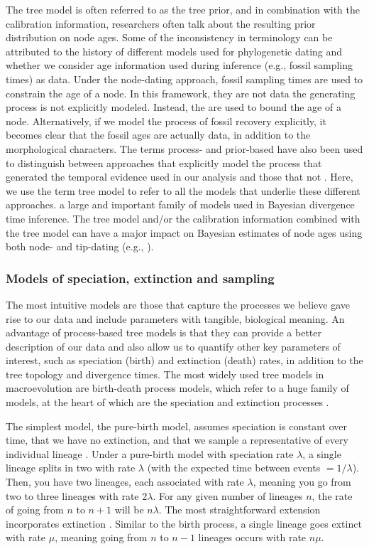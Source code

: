 The tree model is often referred to as the tree prior, and in combination with the calibration information, researchers often talk about the resulting prior distribution on node ages.
Some of the inconsistency in terminology can be attributed to the history of different models used for phylogenetic dating and whether we consider age information used during inference (e.g., fossil sampling times) as data.
Under the node-dating approach, fossil sampling times are used to constrain the age of a node.
In this framework, they are not data  the generating process is not explicitly modeled.
Instead, the  are used to bound the age of a node.
Alternatively, if we model the process of fossil recovery explicitly, it becomes clear that the fossil ages are actually data, in addition to the morphological characters.
The terms process- and prior-based have also been used to distinguish between approaches that explicitly model the  process that generated the temporal evidence used in our analysis and those that  not \citep{Landis2016}.
Here, we use the term tree model to refer to all the models that underlie these different approaches.
 a large and important family of models used in Bayesian divergence time inference.
The tree model and/or the calibration information combined with the tree model can have a major impact on Bayesian estimates of node ages using both node- and tip-dating (e.g., \citep{Ho2009,Warnock2011,OReilly2015,matzke2016,Matschiner2017}).

\subsubsection{Models of speciation, extinction and sampling}

The most intuitive models are those that capture the processes we believe gave rise to our data and include parameters with tangible, biological meaning.
An advantage of process-based tree models is that they can provide a better description of our data and also allow us to quantify other key parameters of interest, such as speciation (birth) and extinction (death) rates, in addition to the tree topology and divergence times.
The most widely used tree models in macroevolution are birth-death process models, which refer to a huge family of models, at the heart of which are the speciation and extinction processes .

The simplest model, the pure-birth model, assumes speciation is constant over time, that we have no extinction, and that we sample a representative of every individual lineage \citep{Yule1925}.
Under a pure-birth model with speciation rate $\lambda$, a single lineage splits in two with rate $\lambda$ (with the expected time between events $=1/\lambda$). Then, you have two lineages, each associated with rate $\lambda$, meaning you go from two to three lineages with rate 2$\lambda$. For any given number of lineages $n$, the rate of going from $n$ to $n+1$ will be $n\lambda$.
The most straightforward extension incorporates  extinction \citep{Kendall1948}.
Similar to the birth process, a single lineage goes extinct with rate $\mu$, meaning going from $n$ to $n-1$ lineages occurs with rate $n\mu$.

